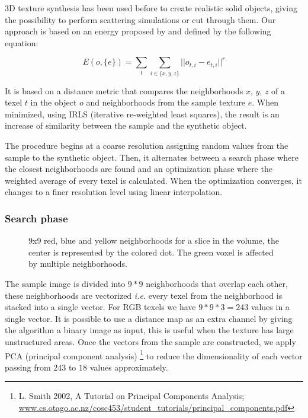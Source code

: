 3D texture synthesis has been used before to create realistic solid objects,
giving the possibility to perform scattering simulations or cut through them.
Our approach is based on an energy proposed by \cite{kwatra:2005:SIGGRAPH} and defined by the following equation:

\begin{equation}
 E(o, \{e\} ) = \sum_{t} \sum_{i \in \{x, y, z\}} || o_{t, i} - e_{t, i} ||^r
 \label{equ:imagenergy} 
\end{equation}

It is based on a distance metric that compares the neighborhoods $x$, $y$, $z$ 
of a texel $t$ in the object $o$ and neighborhoods from the sample texture $e$. 
When minimized, using IRLS (iterative re-weighted least squares), 
the result is an increase of similarity between the sample and the synthetic object.

The procedure begins at a coarse resolution assigning random values from the sample to the synthetic object. 
Then, it alternates between a search phase where the closest neighborhoods are found 
and an optimization phase where the weighted average of every texel is calculated. 
When the optimization converges, it changes to a finer resolution level using linear interpolation.

\subsubsection{Search phase}
\label{sec:SearchPhase}

\begin{figure}[!h]  
  \centering
  \caption{9x9 red, blue and yellow neighborhoods for a slice in the volume, the center is represented by the colored dot.
           The green voxel is affected by multiple neighborhoods.}
  \label{fig:search_phase}  
 \end{figure}

The sample image is divided into $9*9$ neighborhoods that overlap each other, these neighborhoods are vectorized \emph{i.e.} 
every texel from the neighborhood is stacked into a single vector. For RGB texels we have $9 * 9 * 3 = 243$ 
values in a single vector. It is possible to 
use a distance map as an extra channel by giving the algorithm a binary image as input, 
this is useful when the texture has large unstructured areas.
Once the vectors from the sample are constructed, we apply PCA 
(principal component analysis) \footnote{L. Smith 2002, A Tutorial on Principal Components Analysis; \url{www.cs.otago.ac.nz/cosc453/student_tutorials/principal_components.pdf}}
to reduce the dimensionality of each vector passing from $243$ to $18$ values approximately.

